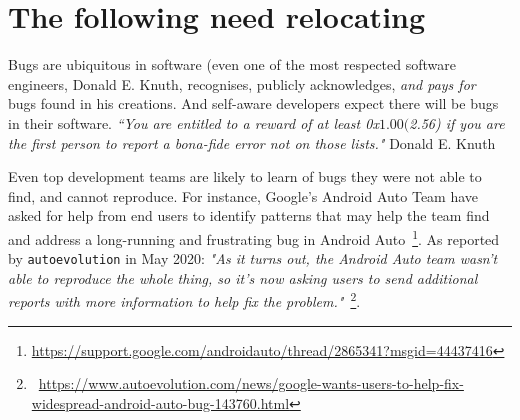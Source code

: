 \section{The following need relocating}
Bugs are ubiquitous in software (even one of the most respected software engineers, Donald E. Knuth, recognises, publicly acknowledges, \emph{and pays for}~\cite{knuth_trutex, wikipedia__knuth_reward_checks_2020} bugs found in his creations. And self-aware developers expect there will be bugs in their software. \emph{``You are entitled to a reward of at least 0x$1.00 ($2.56) if you are the first person to report a bona-fide error not on those lists."} Donald E. Knuth~\cite{knuth_the_bank_of_san_serriffe}

Even top development teams are likely to learn of bugs they were not able to find, and cannot reproduce. For instance, Google's Android Auto Team have asked for help from end users to identify patterns that may help the team find and address a long-running and frustrating bug in Android Auto~\footnote{\url{https://support.google.com/androidauto/thread/2865341?msgid=44437416}}. As reported by \texttt{autoevolution} in May 2020:  
\emph{"As it turns out, the Android Auto team wasn’t able to reproduce the whole thing, so it’s now asking users to send additional reports with more information to help fix the problem."}~\footnote{~\url{https://www.autoevolution.com/news/google-wants-users-to-help-fix-widespread-android-auto-bug-143760.html}}.

